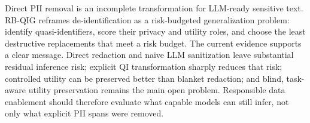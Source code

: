 \documentclass{article}
\begin{document}
Direct PII removal is an incomplete transformation for LLM-ready sensitive
text. RB-QIG reframes de-identification as a risk-budgeted generalization
problem: identify quasi-identifiers, score their privacy and utility roles, and
choose the least destructive replacements that meet a risk budget. The current
evidence supports a clear message. Direct redaction and naive LLM sanitization
leave substantial residual inference risk; explicit QI transformation sharply
reduces that risk; controlled utility can be preserved better than blanket
redaction; and blind, task-aware utility preservation remains the main open
problem. Responsible data enablement should therefore evaluate what capable
models can still infer, not only what explicit PII spans were removed.



\end{document}
